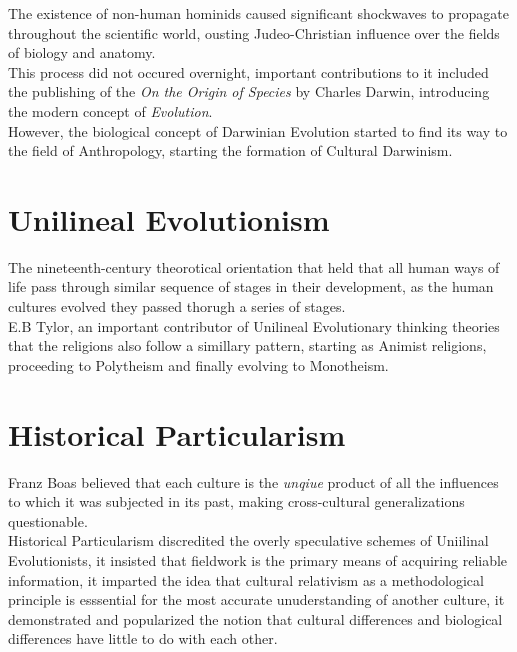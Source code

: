 \documentclass[11pt,a4paper]{book}
\begin{document}
The existence of non-human hominids caused significant shockwaves to propagate throughout the scientific world, ousting Judeo-Christian influence over the fields of biology and anatomy.\\

This process did not occured overnight, important contributions to it included the publishing of the \textit{On the Origin of Species} by Charles Darwin, introducing the modern concept of \textit{Evolution}.\\

However, the biological concept of Darwinian Evolution started to find its way to the field of Anthropology, starting the formation of Cultural Darwinism.

\section{Unilineal Evolutionism}

The nineteenth-century theorotical orientation that held that all human ways of life pass through similar sequence of stages in their development, as the human cultures evolved they passed thorugh a series of stages.\\

E.B Tylor, an important contributor of Unilineal Evolutionary thinking theories that the religions also follow a simillary pattern, starting as Animist religions, proceeding to Polytheism and finally evolving to Monotheism.

\section{Historical Particularism}

Franz Boas believed that each culture is the \textit{unqiue} product of all the influences to which it was subjected in its past, making cross-cultural generalizations questionable.\\

Historical Particularism discredited the overly speculative schemes of Uniilinal Evolutionists, it insisted that fieldwork is the primary means of acquiring reliable information, it imparted the idea that cultural relativism as a methodological principle is esssential for the most accurate unuderstanding of another culture, it demonstrated and popularized the notion that cultural differences and biological differences have little to do with each other.
\end{document}
